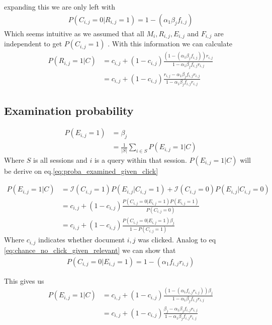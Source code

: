 expanding this we are only left with
\begin{align}
P(C_{i,j}=0|R_{i,j}=1) = 1 - (\alpha_1 \beta_j f_{i,j})
\label{eq:chance_no_click_given_relevant}
\end{align}
Which seems intuitive as we assumed that all $M_i, R_{i,j}, E_{i,j}$ and $F_{i,j}$ are independent to get $P(C_{i,j} = 1)$ . With this information we can calculate 
\begin{align}
P(R_{i,j}=1 | C) &= c_{i,j} + (1-c_{i,j}) \frac { (1 - (\alpha_1 \beta_j f_{i,j}))  r_{i,j}} { 1 - \alpha_1 \beta_j f_{i,j} r_{i,j} }  \nonumber\\
&= c_{i,j} + (1-c_{i,j}) \frac{r_{i,j} - \alpha_1 \beta_j f_{i,j} r_{i,j} }{ 1 - \alpha_1 \beta_j f_{i,j} r_{i,j}}  \nonumber
\end{align}

\subsection{Examination probability}
\begin{align}
P(E_{i,j} = 1) 
&= \beta_j  \nonumber\\
&= \frac{1}{|S|} \sum_{i \in S} P(E_{i,j}=1 | C)  \nonumber
\end{align}
Where $S$ is all sessions and $i$ is a query within that session.
$P(E_{i,j}=1 | C)$ will be derive on eq.\ref{eq:proba_examined_given_click}

\begin{align}
\label{eq:proba_examined_given_click}
P(E_{i,j}=1 | C)
&= \mathcal{I}(C_{i,j} = 1) P(E_{i,j}|C_{i,j}=1) + \mathcal{I}(C_{i,j} = 0) P(E_{i,j}|C_{i,j}=0) \\
&= c_{i,j} + (1-c_{i,j}) \frac {P(C_{i,j}=0|E_{i,j}=1) P(E_{i,j} = 1)} {P(C_{i,j} = 0)}  \nonumber\\
&= c_{i,j} + (1-c_{i,j}) \frac {P(C_{i,j}=0|E_{i,j}=1) \beta_j} { 1 - P(C_{i,j} = 1)}  \nonumber
\end{align}
Where $c_{i,j}$ indicates whether document $i,j$ was clicked.
Analog to eq \ref{eq:chance_no_click_given_relevant} we can show that
\begin{align}
P(C_{i,j}=0|E_{i,j}=1) = 1 - (\alpha_1 f_{i,j} r_{i,j})  \nonumber
\end{align}

This gives us 
\begin{align}
P(E_{i,j}=1 | C) 
&= c_{i,j} + (1-c_{i,j}) \frac {( 1 - (\alpha_1 f_{i,j} r_{i,j}) )\beta_j} { 1 - \alpha_1 \beta_j f_{i,j} r_{i,j}}  \nonumber\\
& = c_{i,j} + (1-c_{i,j}) \frac {\beta_j - \alpha_1 \beta_j f_{i,j} r_{i,j}} { 1 - \alpha_1 \beta_j f_{i,j} r_{i,j}}  \nonumber
\end{align}

